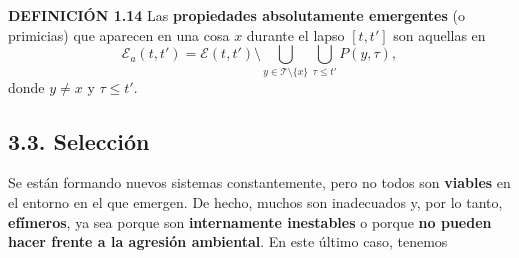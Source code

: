 {\textbf{DEFINICIÓN 1.14} Las \textbf{propiedades absolutamente emergentes} (o primicias) que aparecen en una cosa $x$ durante el lapso $[t, t']$ son aquellas en
$$ \mathcal{E}_a(t, t') = \mathcal{E}(t, t') \setminus \bigcup_{y \in \mathcal{T} \setminus \{x\}} \bigcup_{\tau \le t'} P(y, \tau), $$
donde $y \neq x$ y $\tau \le t'$.

\subsection*{3.3. Selección}
Se están formando nuevos sistemas constantemente, pero no todos son \textbf{viables} en el entorno en el que emergen. De hecho, muchos son inadecuados y, por lo tanto, \textbf{efímeros}, ya sea porque son \textbf{internamente inestables} o porque \textbf{no pueden hacer frente a la agresión ambiental}. En este último caso, tenemos
}

